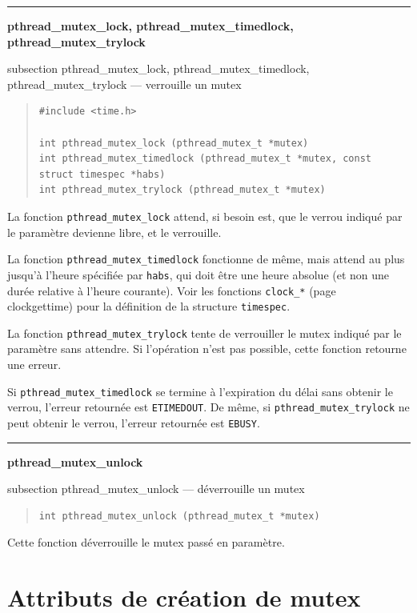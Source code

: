 \documentclass [twoside] {report}
\newcommand {\primitive} [1]
    {
	\phantomsection
	{\large \textbf {#1}}
	\addcontentsline {toc} {subsection} {#1}
    }
\newcommand {\separation}
    {
	\vspace {5mm}
	\nopagebreak
	\hrule
    }
\begin{document}
\separation
\primitive {pthread\_mutex\_lock, pthread\_mutex\_timedlock, pthread\_mutex\_trylock} --- verrouille un mutex
    \label {pthreadmutextimedlock}

\begin {quote}
\begin {verbatim}
#include <time.h>

int pthread_mutex_lock (pthread_mutex_t *mutex)
int pthread_mutex_timedlock (pthread_mutex_t *mutex, const struct timespec *habs)
int pthread_mutex_trylock (pthread_mutex_t *mutex)
\end{verbatim}
\end {quote}

La fonction \verb|pthread_mutex_lock| attend, si besoin est, que le
verrou indiqué par le paramètre devienne libre, et le verrouille.

La fonction \verb|pthread_mutex_timedlock| fonctionne de même, mais
attend au plus jusqu'à l'heure spécifiée par \texttt {habs}, qui
doit être une heure absolue (et non une durée relative à l'heure
courante). Voir les fonctions \texttt {clock\_*} (page~\pageref
{clockgettime}) pour la définition de la structure \texttt {timespec}.

La fonction \verb|pthread_mutex_trylock| tente de verrouiller le mutex
indiqué par le paramètre sans attendre. Si l'opération n'est pas
possible, cette fonction retourne une erreur.

Si \verb|pthread_mutex_timedlock| se termine à l'expiration du délai
sans obtenir le verrou, l'erreur retournée est \texttt {ETIMEDOUT}.
De même, si \verb|pthread_mutex_trylock| ne peut obtenir le verrou,
l'erreur retournée est \texttt {EBUSY}.


\separation
\primitive {pthread\_mutex\_unlock} --- déverrouille un mutex

\begin {quote}
\begin {verbatim}
int pthread_mutex_unlock (pthread_mutex_t *mutex)
\end{verbatim}
\end {quote}

Cette fonction déverrouille le mutex passé en paramètre.


\section {Attributs de création de mutex}
\end{document}
